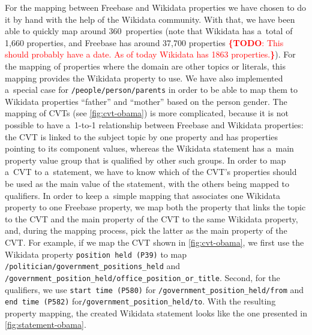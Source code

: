 \documentclass{acm_proc_article-sp}
\newcommand{\todo}[1]{\noindent\textcolor{red}{{\bf \{TODO}: #1{\bf \}}}}
\begin{document}
For the mapping between Freebase and Wikidata properties we have chosen to do it by hand
with the help of the Wikidata community.
With that, we have been able to quickly map around 360~properties
(note that Wikidata has a~total of 1,660 properties, and Freebase has around 37,700 properties
\todo{This should probably have a date. As of today Wikidata has 1863 properties.}).
For the mapping of properties where the domain are other topics or literals,
this mapping provides the Wikidata property to use.
We have also implemented a~special case for \texttt{/people/person/parents}
in order to be able to map them to Wikidata properties ``father'' and ``mother''
based on the person gender.
The mapping of CVTs (see \autoref{fig:cvt-obama}) is more complicated,
because it is not possible to have a~\mbox{1-to-1} relationship
between Freebase and Wikidata properties: the CVT is linked to the subject topic by one property
and has properties pointing to its component values, whereas the Wikidata statement
has a~main property value group that is qualified by other such groups.
In order to map a~CVT to a~statement, we have to know which of the CVT's properties
should be used as the main value of the statement, with the others being mapped to qualifiers.
In order to keep a~simple mapping that associates one Wikidata property to one Freebase property,
we map both the property that links the topic to the CVT
and the main property of the CVT to the same Wikidata property, and, during the mapping process,
pick the latter as the main property of the CVT.
For example, if we map the CVT shown in \autoref{fig:cvt-obama},
we first use the Wikidata property \texttt{position held (P39)} to map
\texttt{/politician/government\_positions\_held} and
\texttt{/government\_position\_held/office\_position\_or\_title}.
Second, for the qualifiers, we use \texttt{start time (P580)}
for \texttt{/government\_position\_held/from} and \texttt{end time (P582)}
for\linebreak \texttt{/government\_position\_held/to}.
With the resulting property mapping, the created Wikidata statement
looks like the one presented in \autoref{fig:statement-obama}.
\end{document}
